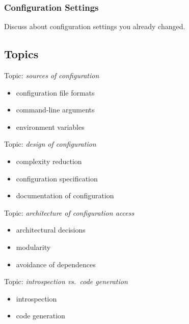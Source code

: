 \begin{assignment}
	\frametitle{Configuration Settings}
	\begin{task}
	Discuss about configuration settings you already changed.
	\end{task}
\end{assignment}

\subsection{Topics}
\begin{frame}
	Topic: \textit{sources of configuration}
	\begin{itemize}
		\item configuration file formats
		\item command-line arguments
		\item environment variables
	\end{itemize}
\end{frame}

\begin{frame}
	Topic: \textit{design of configuration}
	\begin{itemize}
		\item complexity reduction
		\item configuration specification
		\item documentation of configuration
	\end{itemize}
\end{frame}

\begin{frame}
	Topic: \textit{architecture of configuration access}
	\begin{itemize}
		\item architectural decisions
		\item modularity
		\item avoidance of dependences
	\end{itemize}
\end{frame}

\begin{frame}
	Topic: \textit{introspection vs.\ code generation}
	\begin{itemize}
		\item introspection
		\item code generation
	\end{itemize}
\end{frame}

